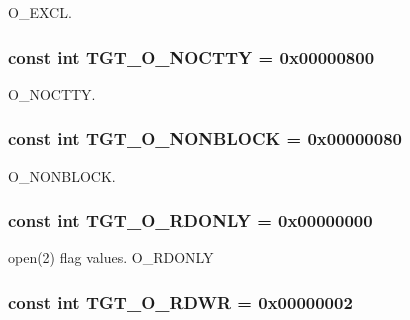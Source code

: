O\_\-EXCL. \hypertarget{classMipsLinux_adfd4240281579e5f60c5e22c601225d8}{
\subsubsection[{TGT\_\-O\_\-NOCTTY}]{\setlength{\rightskip}{0pt plus 5cm}const int {\bf TGT\_\-O\_\-NOCTTY} = 0x00000800}}
\label{classMipsLinux_adfd4240281579e5f60c5e22c601225d8}


O\_\-NOCTTY. \hypertarget{classMipsLinux_a0ea5420b4c9b45ba342a266fb77ac942}{
\subsubsection[{TGT\_\-O\_\-NONBLOCK}]{\setlength{\rightskip}{0pt plus 5cm}const int {\bf TGT\_\-O\_\-NONBLOCK} = 0x00000080}}
\label{classMipsLinux_a0ea5420b4c9b45ba342a266fb77ac942}


O\_\-NONBLOCK. \hypertarget{classMipsLinux_ad266b23a0ae07d1833e18bae651f3411}{
\subsubsection[{TGT\_\-O\_\-RDONLY}]{\setlength{\rightskip}{0pt plus 5cm}const int {\bf TGT\_\-O\_\-RDONLY} = 0x00000000}}
\label{classMipsLinux_ad266b23a0ae07d1833e18bae651f3411}


open(2) flag values. O\_\-RDONLY \hypertarget{classMipsLinux_ac6fa9ecf5d2f3314f197698f1099e2ac}{
\subsubsection[{TGT\_\-O\_\-RDWR}]{\setlength{\rightskip}{0pt plus 5cm}const int {\bf TGT\_\-O\_\-RDWR} = 0x00000002}}
\label{classMipsLinux_ac6fa9ecf5d2f3314f197698f1099e2ac}


